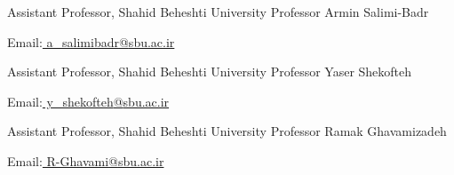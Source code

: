\begin{cventries}
    \cventry
    {Assistant Professor, Shahid Beheshti University}
    {Professor Armin Salimi-Badr}
    {}
    {}
    {
      \begin{cvitems}
	    \item{Email:\href{mailto:a_salimibadr@sbu.ac.ir}{ a\_salimibadr{@}sbu.ac.ir}}
      \end{cvitems}
    }
    \vspace{0.6 cm}
    \cventry
    {Assistant Professor, Shahid Beheshti University}
    {Professor Yaser Shekofteh}
    {}
    {}
    {
      \begin{cvitems}
	    \item{Email:\href{mailto:y_shekofteh@sbu.ac.ir}{ y\_shekofteh{@}sbu.ac.ir}}
      \end{cvitems}
    }
    \vspace{0.6 cm}
    \cventry
    {Assistant Professor, Shahid Beheshti University}
    {Professor Ramak Ghavamizadeh}
    {}
    {}
    {
      \begin{cvitems}
	    \item{Email:\href{mailto:R-Ghavami@sbu.ac.ir}{ R-Ghavami{@}sbu.ac.ir}}
      \end{cvitems}
    }
\end{cventries}
